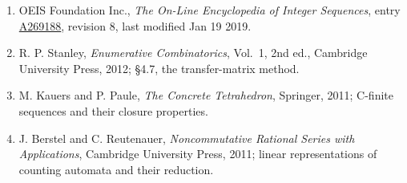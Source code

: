 \documentclass[11pt]{article}
\theoremstyle{definition}
\begin{document}
\begin{enumerate}

\item OEIS Foundation Inc., \emph{The On-Line Encyclopedia of Integer Sequences}, entry \href{https://oeis.org/A269188}{A269188}, revision 8, last modified Jan 19 2019.

\item R. P. Stanley, \emph{Enumerative Combinatorics}, Vol.~1, 2nd ed., Cambridge University Press, 2012; \S4.7, the transfer-matrix method.

\item M. Kauers and P. Paule, \emph{The Concrete Tetrahedron}, Springer, 2011; C-finite sequences and their closure properties.

\item J. Berstel and C. Reutenauer, \emph{Noncommutative Rational Series with Applications}, Cambridge University Press, 2011; linear representations of counting automata and their reduction.

\end{enumerate}
\end{document}
